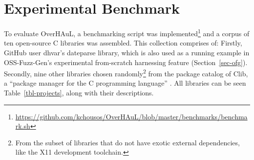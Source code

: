 \documentclass[
  a4paper,
  DIV=11,
  numbers=noendperiod]{scrreprt}
\theoremstyle{definition}
\theoremstyle{remark}
\begin{document}
\section{Experimental Benchmark}\label{sec-benchmark}

To evaluate OverHAuL, a benchmarking script was implemented\footnote{\url{https://github.com/kchousos/OverHAuL/blob/master/benchmarks/benchmark.sh}}
and a corpus of ten open-source C libraries was assembled. This
collection comprises of: Firstly, GitHub user dhvar's dateparse library,
which is also used as a running example in OSS-Fuzz-Gen's
\autocite{oss-fuzz-gen} experimental from-scratch harnessing feature
(Section~\ref{sec-ofg}). Secondly, nine other libraries chosen
randomly\footnote{From the subset of libraries that do not have exotic
  external dependencies, like the X11 development toolchain.} from the
package catalog of Clib, a ``package manager for the C programming
language'' \autocite{clibs,clib}. All libraries can be seen
Table~\ref{tbl-projects}, along with their descriptions.
\end{document}
